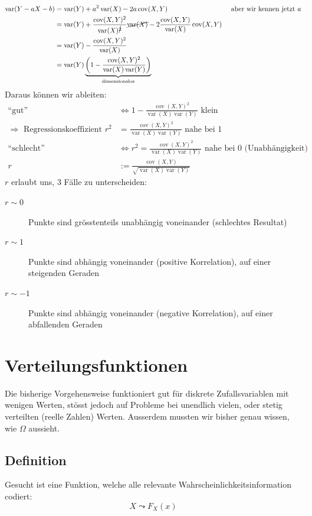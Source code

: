 \documentclass[10pt,a4paper]{scrartcl}
\DeclareMathOperator{\var}{var}
\DeclareMathOperator{\cov}{cov}
\begin{document}
\begin{align*}
\var(Y-aX-b) & = \var(Y) + a^2\var(X) - 2a\cov(X, Y) & \text{ aber wir kennen jetzt } a\\
             & = \var(Y) + \frac{\cov(X, Y)^2}{\var(X)^{\cancel{2}}}\cancel{\var(X)} - 2\frac{\cov(X, Y)}{\var(X)} \cov(X,Y) \\
             & = \var(Y) - \frac{\cov(X, Y)^2}{\var(X)}\\
             & = \var(Y) \underbrace{\left(1 - \frac{\cov(X,Y)^2}{\var(X)\var(Y)}\right)}_{\text{dimensionslos}}
\end{align*}
Daraus können wir ableiten:
\begin{align*}
\text{``gut''} & \Leftrightarrow 1 - \frac{\cov(X,Y)^2}{\var(X)\var(Y)} \text{ klein} \\
               \Rightarrow \text{ Regressionskoeffizient } r^2 & = \frac{\cov(X,Y)^2}{\var(X)\var(Y)} \text{ nahe bei } 1 \\
\text{``schlecht''} & \Leftrightarrow r^2 = \frac{\cov(X,Y)^2}{\var(X)\var(Y)} \text{ nahe bei } 0 \text{ (Unabhängigkeit)} \\
r & := \frac{\cov(X,Y)}{\sqrt{\var(X)\var(Y)}}
\end{align*}
$r$ erlaubt uns, 3 Fälle zu unterscheiden:
\begin{description}
\item[$r\sim 0$] Punkte sind grösstenteils unabhängig voneinander (schlechtes Resultat)
\item[$r\sim 1$] Punkte sind abhängig voneinander (positive Korrelation), auf einer steigenden Geraden
\item[$r\sim -1$] Punkte sind abhängig voneinander (negative Korrelation), auf einer abfallenden Geraden
\end{description}

\section{Verteilungsfunktionen}
Die bisherige Vorgehensweise funktioniert gut für diskrete Zufallsvariablen mit wenigen Werten, stösst jedoch auf Probleme bei unendlich vielen, oder stetig verteilten (reelle Zahlen) Werten. Ausserdem mussten wir bisher genau wissen, wie $\Omega$ aussieht.

\subsection{Definition}
Gesucht ist eine Funktion, welche alle relevante Wahrscheinlichkeitsinformation codiert:
$$X \leadsto F_X(x)$$
\end{document}
